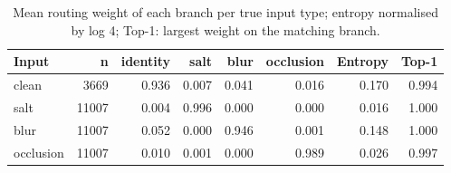 \begin{table}[t]
\centering
\caption{Mean routing weight of each branch per true input type; entropy normalised by log 4; Top-1: largest weight on the matching branch.}
\label{tab:task3_routing_by_type}
\begin{tabular}{lrrrrrrr}
\toprule
Input & n & identity & salt & blur & occlusion & Entropy & Top-1 \\
\midrule
clean & 3669 & 0.936 & 0.007 & 0.041 & 0.016 & 0.170 & 0.994 \\
salt & 11007 & 0.004 & 0.996 & 0.000 & 0.000 & 0.016 & 1.000 \\
blur & 11007 & 0.052 & 0.000 & 0.946 & 0.001 & 0.148 & 1.000 \\
occlusion & 11007 & 0.010 & 0.001 & 0.000 & 0.989 & 0.026 & 0.997 \\
\bottomrule
\end{tabular}
\end{table}
